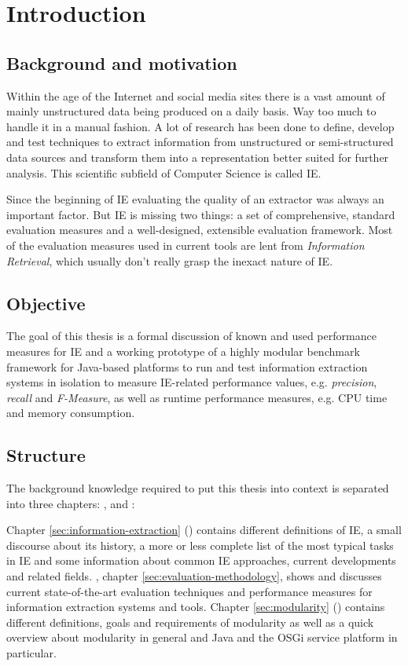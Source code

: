 \section{Introduction}

\subsection{Background and motivation}
Within the age of the Internet and social media sites there is a vast amount of mainly unstructured data being produced on a daily basis. Way too much to handle it in a manual fashion. A lot of research has been done to define, develop and test techniques to extract information from unstructured or semi-structured data sources and transform them into a representation better suited for further analysis. This scientific subfield of Computer Science is called \gls{IE}.

Since the beginning of \gls{IE} evaluating the quality of an extractor was always an important factor. But \gls{IE} is missing two things: a set of comprehensive, standard evaluation measures and a well-designed, extensible evaluation framework. Most of the evaluation measures used in current tools are lent from \textit{Information Retrieval}, which usually don't really grasp the inexact nature of \gls{IE}.


\subsection{Objective}
The goal of this thesis is a formal discussion of known and used performance measures for IE and a working prototype of a highly modular benchmark framework for Java-based platforms to run and test information extraction systems in isolation to measure IE-related performance values, e.g. \textit{precision}, \textit{recall} and \textit{F-Measure}, as well as runtime performance measures, e.g. CPU time and memory consumption.

\subsection{Structure}
The background knowledge required to put this thesis into context is separated into three chapters: ,  and :

Chapter \ref{sec:information-extraction} () contains different definitions of \gls{IE}, a small discourse about its history, a more or less complete list of the most typical tasks in \gls{IE} and some information about common \gls{IE} approaches, current developments and related fields. , chapter \ref{sec:evaluation-methodology}, shows and discusses current state-of-the-art evaluation techniques and performance measures for information extraction systems and tools. Chapter \ref{sec:modularity} () contains different definitions, goals and requirements of modularity as well as a quick overview about modularity in general and Java and the \gls{OSGi} service platform in particular.

